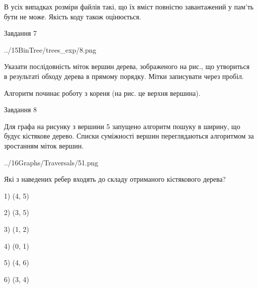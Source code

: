 \documentclass[12pt, ukrainian]{article}
\begin{document}
{В усіх випадках розміри файлів такі, що їх вміст повністю завантажений у пам'ть бути не може. Якість коду також оцінюється.



\vspace{10mm}\par

\newpage
\begin{minipage}[t]{9.7cm}
               
{\begin{center}Завдання {7}\end{center}}
\vspace{-4mm}

\begin{center}
	{../15BinTree/trees_exp/8.png}
\end{center}
Указати послідовність міток вершин дерева, зображеного на рис., що утвориться в результаті обходу дерева в прямому порядку. Мітки записувати через пробіл.\par Алгоритм починає роботу з кореня (на рис. це верхня вершина).\par

\end{minipage}
\vline \hspace{8mm}
\begin{minipage}[t]{8.0cm}
               
{\begin{center}Завдання {8}\end{center}}
\vspace{-4mm}
Для графа на рисунку з вершини 5 запущено алгоритм пошуку в ширину, що будує кістякове дерево. Списки суміжності вершин переглядаються алгоритмом за зростанням міток вершин.\par
\begin{center}
	{../16Graphs/Traversals/51.png}
\end{center}
\par Які з наведених ребер входять до складу отриманого кістякового дерева?\par
1) (4, 5)\par
2) (3, 5)\par
3) (1, 2)\par
4) (0, 1)\par
5) (4, 6)\par
6) (3, 4)\par
{\vskip 15pt} \par


\end{minipage}}
\end{document}
